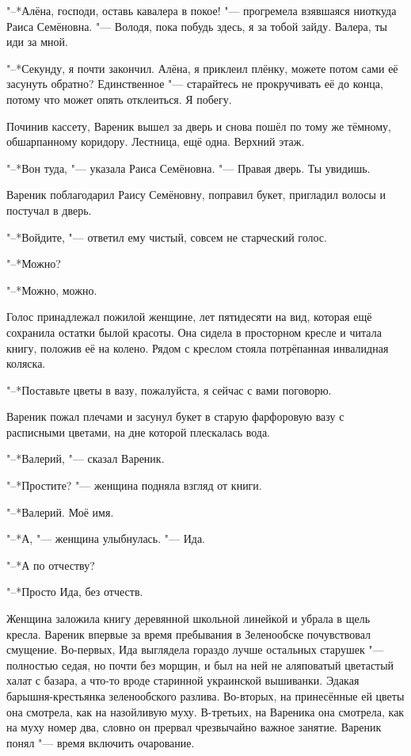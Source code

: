 "--*Алёна, господи, оставь кавалера в покое! "--- прогремела взявшаяся ниоткуда Раиса Семёновна.
"--- Володя, пока побудь здесь, я за тобой зайду.
Валера, ты иди за мной.

"--*Секунду, я почти закончил.
Алёна, я приклеил плёнку, можете потом сами её засунуть обратно?
Единственное "--- старайтесь не прокручивать её до конца, потому что может опять отклеиться.
Я побегу.

Починив кассету, Вареник вышел за дверь и снова пошёл по тому же тёмному, обшарпанному коридору.
Лестница, ещё одна.
Верхний этаж.

"--*Вон туда, "--- указала Раиса Семёновна.
"--- Правая дверь.
Ты увидишь.

Вареник поблагодарил Раису Семёновну, поправил букет, пригладил волосы и постучал в дверь.

"--*Войдите, "--- ответил ему чистый, совсем не старческий голос.

\asterism

"--*Можно?

"--*Можно, можно.

Голос принадлежал пожилой женщине, лет пятидесяти на вид, которая ещё сохранила остатки былой красоты.
Она сидела в просторном кресле и читала книгу, положив её на колено.
Рядом с креслом стояла потрёпанная инвалидная коляска.

"--*Поставьте цветы в вазу, пожалуйста, я сейчас с вами поговорю.

Вареник пожал плечами и засунул букет в старую фарфоровую вазу с расписными цветами, на дне которой плескалась вода.

"--*Валерий, "--- сказал Вареник.

"--*Простите? "--- женщина подняла взгляд от книги.

"--*Валерий.
Моё имя.

"--*А, "--- женщина улыбнулась.
"--- Ида.

"--*А по отчеству?

"--*Просто Ида, без отчеств.

Женщина заложила книгу деревянной школьной линейкой и убрала в щель кресла.
Вареник впервые за время пребывания в Зеленообске почувствовал смущение.
Во-первых, Ида выглядела гораздо лучше остальных старушек "--- полностью седая, но почти без морщин, и был на ней не аляповатый цветастый халат с базара, а что-то вроде старинной украинской вышиванки.
Эдакая барышня-крестьянка зеленообского разлива.
Во-вторых, на принесённые ей цветы она смотрела, как на назойливую муху.
В-третьих, на Вареника она смотрела, как на муху номер два, словно он прервал чрезвычайно важное занятие.
Вареник понял "--- время включить очарование.

